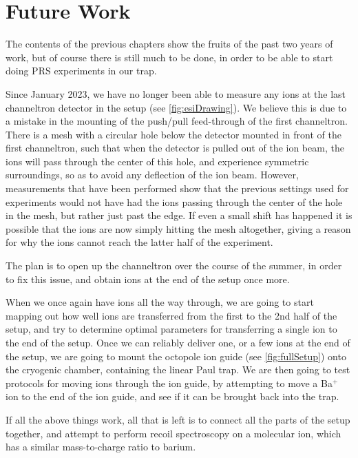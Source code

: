 
\chapter{Future Work}
\label{chap:future}
The contents of the previous chapters show the fruits of the past two years of work, but of course there is still much to be done, in order to be able to start doing PRS experiments in our trap.


Since January 2023, we have no longer been able to measure any ions at the last channeltron detector in the setup (see \cref{fig:esiDrawing}). We believe this is due to a mistake in the mounting of the push/pull feed-through of the first channeltron. There is a mesh with a circular hole below the detector mounted in front of the first channeltron, such that when the detector is pulled out of the ion beam, the ions will pass through the center of this hole, and experience symmetric surroundings, so as to avoid any deflection of the ion beam.
However, measurements that have been performed show that the previous settings used for experiments would not have had the ions passing through the center of the hole in the mesh, but rather just past the edge. If even a small shift has happened it is possible that the ions are now simply hitting the mesh altogether, giving a reason for why the ions cannot reach the latter half of the experiment.

The plan is to open up the channeltron over the course of the summer, in order to fix this issue, and obtain ions at the end of the setup once more.

When we once again have ions all the way through, we are going to start mapping out how well ions are transferred from the first to the 2nd half of the setup, and try to determine optimal parameters for transferring a single ion to the end of the setup.
Once we can reliably deliver one, or a few ions at the end of the setup, we are going to mount the octopole ion guide (see \cref{fig:fullSetup}) onto the cryogenic chamber, containing the linear Paul trap. We are then going to test protocols for moving ions through the ion guide, by attempting to move a Ba$^+$ ion to the end of the ion guide, and see if it can be brought back into the trap.

If all the above things work, all that is left is to connect all the parts of the setup together, and attempt to perform recoil spectroscopy on a molecular ion, which has a similar mass-to-charge ratio to barium.